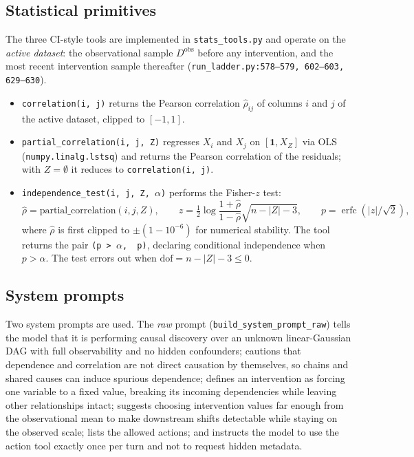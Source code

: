 \subsection{Statistical primitives}
\label{app:policies:stats}

The three CI-style tools are implemented in \texttt{stats\_tools.py} and operate on the \emph{active dataset}: the observational sample $D^{\text{obs}}$ before any intervention, and the most recent intervention sample thereafter (\texttt{run\_ladder.py:578--579, 602--603, 629--630}).

\begin{itemize}
\itemsep0pt
\item \texttt{correlation(i, j)} returns the Pearson correlation $\hat\rho_{ij}$ of columns $i$ and $j$ of the active dataset, clipped to $[-1, 1]$.
\item \texttt{partial\_correlation(i, j, Z)} regresses $X_i$ and $X_j$ on $[\mathbf{1}, X_Z]$ via OLS (\texttt{numpy.linalg.lstsq}) and returns the Pearson correlation of the residuals; with $Z = \emptyset$ it reduces to \texttt{correlation(i, j)}.
\item \texttt{independence\_test(i, j, Z, $\alpha$)} performs the Fisher-$z$ test:
\begin{equation}
\hat\rho = \mathrm{partial\_correlation}(i, j, Z), \qquad
z = \tfrac{1}{2}\log\frac{1 + \hat\rho}{1 - \hat\rho}\sqrt{n - |Z| - 3}, \qquad
p = \operatorname{erfc}(|z|/\sqrt{2}),
\end{equation}
where $\hat\rho$ is first clipped to $\pm(1 - 10^{-6})$ for numerical stability. The tool returns the pair \texttt{(p > $\alpha$,\, p)}, declaring conditional independence when $p > \alpha$. The test errors out when $\mathrm{dof} = n - |Z| - 3 \le 0$.
\end{itemize}

\subsection{System prompts}
\label{app:policies:prompts}

Two system prompts are used. The \emph{raw} prompt (\texttt{build\_system\_prompt\_raw}) tells the model that it is performing causal discovery over an unknown linear-Gaussian DAG with full observability and no hidden confounders; cautions that dependence and correlation are not direct causation by themselves, so chains and shared causes can induce spurious dependence; defines an intervention as forcing one variable to a fixed value, breaking its incoming dependencies while leaving other relationships intact; suggests choosing intervention values far enough from the observational mean to make downstream shifts detectable while staying on the observed scale; lists the allowed actions; and instructs the model to use the action tool exactly once per turn and not to request hidden metadata.

